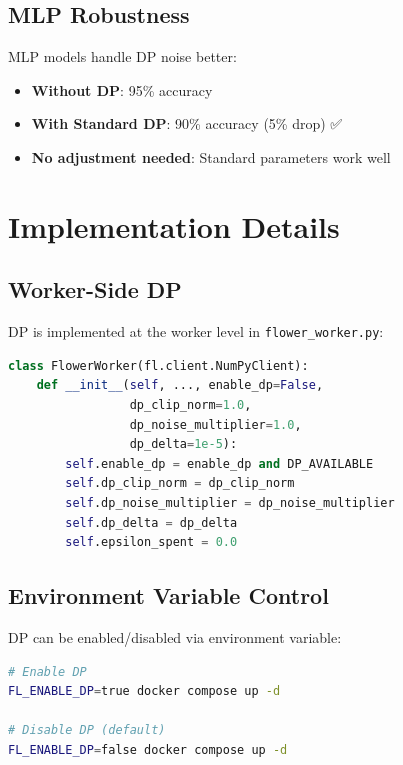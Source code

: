 \documentclass[12pt,a4paper]{article}
\begin{document}
\subsection{MLP Robustness}

MLP models handle DP noise better:

\begin{itemize}
    \item \textbf{Without DP}: 95\% accuracy
    \item \textbf{With Standard DP}: 90\% accuracy (5\% drop) ✅
    \item \textbf{No adjustment needed}: Standard parameters work well
\end{itemize}

\section{Implementation Details}

\subsection{Worker-Side DP}

DP is implemented at the worker level in \texttt{flower\_worker.py}:

\begin{lstlisting}[language=Python, basicstyle=\small]
class FlowerWorker(fl.client.NumPyClient):
    def __init__(self, ..., enable_dp=False, 
                 dp_clip_norm=1.0, 
                 dp_noise_multiplier=1.0, 
                 dp_delta=1e-5):
        self.enable_dp = enable_dp and DP_AVAILABLE
        self.dp_clip_norm = dp_clip_norm
        self.dp_noise_multiplier = dp_noise_multiplier
        self.dp_delta = dp_delta
        self.epsilon_spent = 0.0
\end{lstlisting}

\subsection{Environment Variable Control}

DP can be enabled/disabled via environment variable:

\begin{lstlisting}[language=bash, basicstyle=\small]
# Enable DP
FL_ENABLE_DP=true docker compose up -d

# Disable DP (default)
FL_ENABLE_DP=false docker compose up -d
\end{lstlisting}
\end{document}

